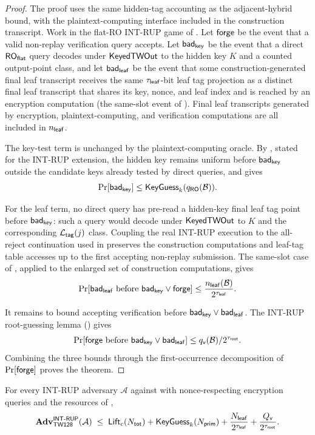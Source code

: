 \begin{proof}
The proof uses the same hidden-tag accounting as the adjacent-hybrid bound, with
the plaintext-computing interface included in the construction transcript.
Work in the flat-RO \textsf{INT-RUP} game of . Let
$\mathsf{forge}$ be the event that a valid non-replay verification query accepts.
Let $\mathsf{bad}_{\mathsf{key}}$ be the event that a direct $\mathsf{RO}_{\mathsf{flat}}$ query decodes under
$\mathsf{KeyedTWOut}$ to the hidden key $K$ and a counted output-point class, and let
$\mathsf{bad}_{\mathsf{leaf}}$ be the event that some construction-generated final leaf
transcript receives the same $\tau_{\mathsf{leaf}}$-bit leaf tag projection as a
distinct final leaf transcript that shares its key, nonce, and leaf index
and is reached by an encryption computation (the same-slot event of
). Final leaf
transcripts generated by encryption, plaintext-computing, and verification
computations are all included in $n_{\mathsf{leaf}}$.

The key-test term is unchanged by the plaintext-computing oracle. By
, stated for the \textsf{INT-RUP} extension,
the hidden key remains uniform before $\mathsf{bad}_{\mathsf{key}}$ outside the candidate keys
already tested by direct queries, and  gives
\[
  \Pr[\mathsf{bad}_{\mathsf{key}}] \leq \mathsf{KeyGuess}_k(q_{\mathsf{RO}}(\mathcal{B})).
\]

For the leaf term, no direct query has pre-read a hidden-key final leaf tag
point before $\mathsf{bad}_{\mathsf{key}}$: such a query would decode under $\mathsf{KeyedTWOut}$ to $K$
and the corresponding $\mathcal{L}_{\mathsf{tag}}(j)$ class. Coupling the real
\textsf{INT-RUP} execution to the all-reject continuation used in
 preserves the construction computations and
leaf-tag table accesses up to the first accepting non-replay submission.
The same-slot case of , applied to the enlarged set
of construction computations, gives
\[
  \Pr[\mathsf{bad}_{\mathsf{leaf}} \text{ before } \mathsf{bad}_{\mathsf{key}} \vee \mathsf{forge}]
  \leq
  \frac{n_{\mathsf{leaf}}(\mathcal{B})}{2^{\tau_{\mathsf{leaf}}}}.
\]

It remains to bound accepting verification before $\mathsf{bad}_{\mathsf{key}} \vee \mathsf{bad}_{\mathsf{leaf}}$.
The \textsf{INT-RUP} root-guessing lemma ()
gives
\[
  \Pr[\mathsf{forge} \text{ before } \mathsf{bad}_{\mathsf{key}} \vee \mathsf{bad}_{\mathsf{leaf}}]
  \leq q_{\mathsf{v}}(\mathcal{B}) / 2^{\tau_{\mathsf{root}}}.
\]
Combining the three bounds through the first-occurrence decomposition
of $\Pr[\mathsf{forge}]$ proves the theorem.
\end{proof}

\begin{theorem}
\label{thm:int-rup}
For every \textsf{INT-RUP} adversary $\mathcal{A}$ against \TW{} with
nonce-respecting encryption queries and the resources of ,
\[
  \mathbf{Adv}^{\mathsf{INT\text{-}RUP}}_{\textsf{TW128}}(\mathcal{A})
  \;\leq\;
  \mathsf{Lift}_c(N_{\mathsf{tot}})
  + \mathsf{KeyGuess}_k(N_{\mathsf{prim}})
  + \frac{N_{\mathsf{leaf}}}{2^{\tau_{\mathsf{leaf}}}}
  + \frac{Q_{\mathsf{v}}}{2^{\tau_{\mathsf{root}}}}.
\]
\end{theorem}

